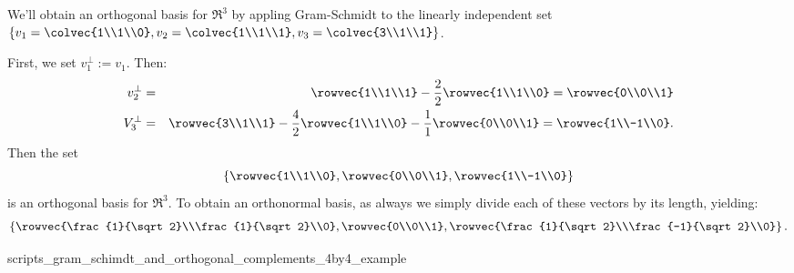 \begin{example}
We'll  obtain an orthogonal basis for $\Re^3$ by appling Gram-Schmidt to the linearly independent set 
$\left\{ v_1=\colvec{1\\1\\0}, v_2=\colvec{1\\1\\1},v_3=\colvec{3\\1\\1} \right\}$.

First, we set $v_1^\perp:=v_1$.  Then:
\begin{eqnarray*}
v_2^\perp&=& \rowvec{1\\1\\1} - \frac{2}{2}\rowvec{1\\1\\0} = \rowvec{0\\0\\1} \\
V_3^\perp&=& \rowvec{3\\1\\1} - \frac{4}{2}\rowvec{1\\1\\0} - \frac{1}{1}\rowvec{0\\0\\1} = \rowvec{1\\-1\\0}. 
\end{eqnarray*}
Then the set
\[
\left\{ \rowvec{1\\1\\0},\rowvec{0\\0\\1},\rowvec{1\\-1\\0}\right\}
\]
is an orthogonal basis for $\Re^3$.  To obtain an orthonormal basis, as always we simply divide each of these vectors by its length, yielding:
\[
\left\{ \rowvec{\frac{1}{\sqrt2}\\\frac{1}{\sqrt2}\\0},\rowvec{0\\0\\1},\rowvec{\frac{1}{\sqrt2}\\\frac{-1}{\sqrt2}\\0}\right\}.
\]
\end{example}

 {scripts_gram_schimdt_and_orthogonal_complements_4by4_example}

